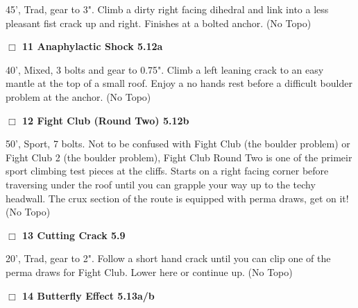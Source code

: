 \begin{multicols}{2}
\begin{adjustwidth}{1.3em}{}
45', Trad, gear to 3". Climb a dirty right facing dihedral and link into a less pleasant fist crack up and right. Finishes at a bolted anchor.
  (No Topo)
\end{adjustwidth}




\needspace{2em}
\label{rt:Anaphylactic Shock}
\colorbox{Goldenrod!20}{
\parbox{0.95\linewidth}{
\hspace{-1ex}\textbf{$\Box$
11 Anaphylactic Shock 5.12a  
}}}
\begin{adjustwidth}{1.3em}{}			

40', Mixed, 3 bolts and gear to 0.75". Climb a left leaning crack to an easy mantle at the top of a small roof. Enjoy a no hands rest before a difficult boulder problem at the anchor.
  (No Topo)
\end{adjustwidth}




\needspace{2em}
\label{rt:Fight Club (Round Two)}
\colorbox{Goldenrod!20}{
\parbox{0.95\linewidth}{
\hspace{-1ex}\textbf{$\Box$
12 Fight Club (Round Two) 5.12b  
}}}
\begin{adjustwidth}{1.3em}{}			

50', Sport, 7 bolts. Not to be confused with Fight Club (the boulder problem) or Fight Club 2 (the boulder problem), Fight Club Round Two is one of the primeir sport climbing test pieces at the cliffs. Starts on a right facing corner before traversing under the roof until you can grapple your way up to the techy headwall. The crux section of the route is equipped with perma draws, get on it!
  (No Topo)
\end{adjustwidth}




\needspace{2em}
\label{rt:Cutting Crack}
\colorbox{green!20}{
\parbox{0.95\linewidth}{
\hspace{-1ex}\textbf{$\Box$
13 Cutting Crack 5.9  
}}}
\begin{adjustwidth}{1.3em}{}			

20', Trad, gear to 2". Follow a short hand crack until you can clip one of the perma draws for Fight Club. Lower here or continue up.
  (No Topo)
\end{adjustwidth}




\needspace{2em}
\label{rt:Butterfly Effect}
\colorbox{Goldenrod!20}{
\parbox{0.95\linewidth}{
\hspace{-1ex}\textbf{$\Box$
14 Butterfly Effect 5.13a/b  
}}}
\begin{adjustwidth}{1.3em}{}			


\end{adjustwidth}
\end{multicols}
